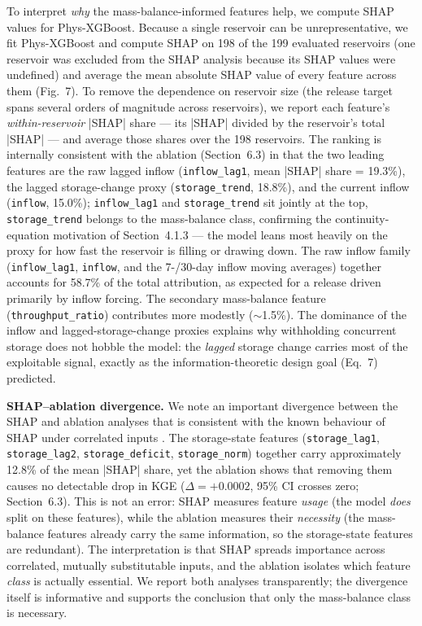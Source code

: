 \documentclass[journal]{ascelike-new}
\begin{document}
To interpret \emph{why} the mass-balance-informed features help, we compute SHAP \citep{Lundberg2017} values for Phys-XGBoost. Because a single reservoir can be unrepresentative, we fit Phys-XGBoost and compute SHAP on 198 of the 199 evaluated reservoirs (one reservoir was excluded from the SHAP analysis because its SHAP values were undefined) and average the mean absolute SHAP value of every feature across them (Fig.~7). To remove the dependence on reservoir size (the release target spans several orders of magnitude across reservoirs), we report each feature's \emph{within-reservoir} |SHAP| share --- its |SHAP| divided by the reservoir's total |SHAP| --- and average those shares over the 198 reservoirs. The ranking is internally consistent with the ablation (Section~6.3) in that the two leading features are the raw lagged inflow (\texttt{inflow\_lag1}, mean |SHAP| share = 19.3\%), the lagged storage-change proxy (\texttt{storage\_trend}, 18.8\%), and the current inflow (\texttt{inflow}, 15.0\%); \texttt{inflow\_lag1} and \texttt{storage\_trend} sit jointly at the top, \texttt{storage\_trend} belongs to the mass-balance class, confirming the continuity-equation motivation of Section~4.1.3 --- the model leans most heavily on the proxy for how fast the reservoir is filling or drawing down. The raw inflow family (\texttt{inflow\_lag1}, \texttt{inflow}, and the 7-/30-day inflow moving averages) together accounts for 58.7\% of the total attribution, as expected for a release driven primarily by inflow forcing. The secondary mass-balance feature (\texttt{throughput\_ratio}) contributes more modestly ($\sim$1.5\%). The dominance of the inflow and lagged-storage-change proxies explains why withholding concurrent storage does not hobble the model: the \emph{lagged} storage change carries most of the exploitable signal, exactly as the information-theoretic design goal (Eq.~7) predicted.

\textbf{SHAP--ablation divergence.} We note an important divergence between the SHAP and ablation analyses that is consistent with the known behaviour of SHAP under correlated inputs \citep{Molnar2022,Aas2021}. The storage-state features (\texttt{storage\_lag1}, \texttt{storage\_lag2}, \texttt{storage\_deficit}, \texttt{storage\_norm}) together carry approximately 12.8\% of the mean |SHAP| share, yet the ablation shows that removing them causes no detectable drop in KGE ($\Delta = +0.0002$, 95\% CI crosses zero; Section~6.3). This is not an error: SHAP measures feature \emph{usage} (the model \emph{does} split on these features), while the ablation measures their \emph{necessity} (the mass-balance features already carry the same information, so the storage-state features are redundant). The interpretation is that SHAP spreads importance across correlated, mutually substitutable inputs, and the ablation isolates which feature \emph{class} is actually essential. We report both analyses transparently; the divergence itself is informative and supports the conclusion that only the mass-balance class is necessary.
\end{document}
